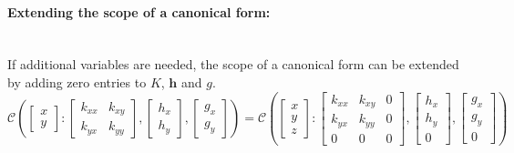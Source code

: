 \documentclass[12pt,oneside,openany,a4paper, %
afrikaans,english,
]{memoir}
\numberwithin{equation}{chapter}
\begin{document}
\paragraph{Extending the scope of a canonical form:}\mbox{}\\
If additional variables are needed, the scope of a canonical form can be extended by adding zero entries to $K$, $\bm{h}$ and $g$. 
\begin{equation}
\mathcal{C}\left(
\begin{bmatrix}
x\\
y
\end{bmatrix}:
\begin{bmatrix}
k_{xx} & k_{xy}\\
k_{yx} & k_{yy}
\end{bmatrix},
\begin{bmatrix}
h_x\\
h_y
\end{bmatrix},
\begin{bmatrix}
g_x\\
g_y
\end{bmatrix}
\right)
=
\mathcal{C}\left(
\begin{bmatrix}
x\\
y\\
z
\end{bmatrix}:
\begin{bmatrix}
k_{xx} & k_{xy} & 0\\
k_{yx} & k_{yy} & 0\\
0 & 0 & 0
\end{bmatrix},
\begin{bmatrix}
h_x\\
h_y\\
0
\end{bmatrix},
\begin{bmatrix}
g_x\\
g_y\\
0
\end{bmatrix}
\right)
\end{equation}
\end{document}
